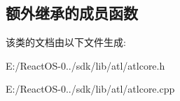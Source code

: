 \subsection*{额外继承的成员函数}


该类的文档由以下文件生成\+:\begin{DoxyCompactItemize}
\item 
E\+:/\+React\+O\+S-\/0../sdk/lib/atl/atlcore.\+h\item 
E\+:/\+React\+O\+S-\/0../sdk/lib/atl/atlcore.\+cpp\end{DoxyCompactItemize}

